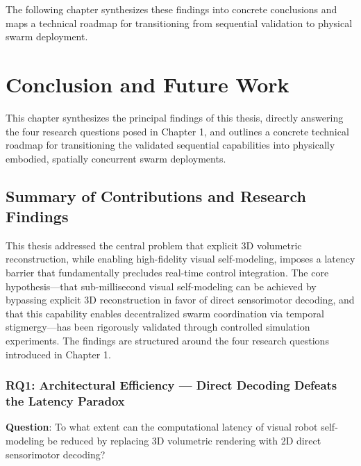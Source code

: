 \documentclass[12pt,a4paper,oneside]{report}
\begin{document}
The following chapter synthesizes these findings into concrete conclusions and maps a technical roadmap for transitioning from sequential validation to physical swarm deployment.





















\chapter{Conclusion and Future Work}

This chapter synthesizes the principal findings of this thesis, directly answering the four research questions posed in Chapter 1, and outlines a concrete technical roadmap for transitioning the validated sequential capabilities into physically embodied, spatially concurrent swarm deployments.

\section{Summary of Contributions and Research Findings}

This thesis addressed the central problem that explicit 3D volumetric reconstruction, while enabling high-fidelity visual self-modeling, imposes a latency barrier that fundamentally precludes real-time control integration. The core hypothesis—that sub-millisecond visual self-modeling can be achieved by bypassing explicit 3D reconstruction in favor of direct sensorimotor decoding, and that this capability enables decentralized swarm coordination via temporal stigmergy—has been rigorously validated through controlled simulation experiments. The findings are structured around the four research questions introduced in Chapter 1.

\subsection{RQ1: Architectural Efficiency — Direct Decoding Defeats the Latency Paradox}

\textbf{Question}: To what extent can the computational latency of visual robot self-modeling be reduced by replacing 3D volumetric rendering with 2D direct sensorimotor decoding?
\end{document}
